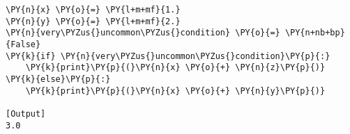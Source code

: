 \begin{Verbatim}[label=\makebox{\url{https://github.com/lucabaldini/cmepda/tree/master/slides/latex/snippets/linting1.py}},commandchars=\\\{\}]
\PY{n}{x} \PY{o}{=} \PY{l+m+mf}{1.}
\PY{n}{y} \PY{o}{=} \PY{l+m+mf}{2.}
\PY{n}{very\PYZus{}uncommon\PYZus{}condition} \PY{o}{=} \PY{n+nb+bp}{False}
\PY{k}{if} \PY{n}{very\PYZus{}uncommon\PYZus{}condition}\PY{p}{:}
    \PY{k}{print}\PY{p}{(}\PY{n}{x} \PY{o}{+} \PY{n}{z}\PY{p}{)}
\PY{k}{else}\PY{p}{:}
    \PY{k}{print}\PY{p}{(}\PY{n}{x} \PY{o}{+} \PY{n}{y}\PY{p}{)}

[Output]
3.0
\end{Verbatim}